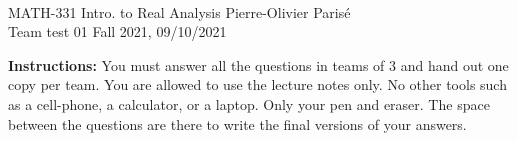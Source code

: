 \documentclass[addpoints, 12pt]{exam}%
\theoremstyle{definition}
\begin{document}
	\noindent \hrulefill \\
	MATH-331 Intro. to Real Analysis \hfill Pierre-Olivier Paris{\'e}\\
	Team test 01 \hfill Fall 2021, 09/10/2021\\\vspace*{-0.7cm}
	
	\noindent\hrulefill
	
\vspace*{1cm}

\noindent{}
\noindent\makebox[\textwidth]{\hrulefill}

\vspace*{1cm}
\begin{center}
\gradetable[h][questions]
\end{center}
\vspace*{1cm}

{\bf Instructions:} You must answer all the questions in teams of $3$ and hand out one copy per team. You are allowed to use the lecture notes only. No other tools such as a cell-phone, a calculator, or a laptop. Only your pen and eraser. The space between the questions are there to write the final versions of your answers.


\newpage
\end{document}
